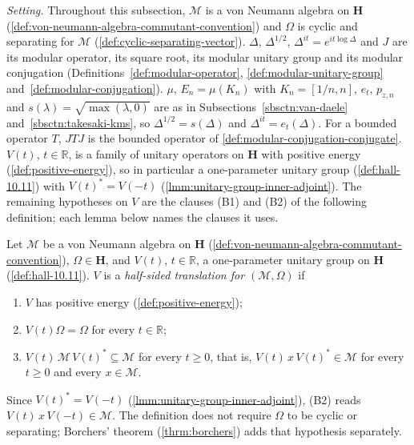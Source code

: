 \emph{Setting.} Throughout this subsection, $\mathcal{M}$ is a von Neumann algebra on $\mathbf{H}$ (\ref{def:von-neumann-algebra-commutant-convention}) and $\Omega$ is cyclic and separating for $\mathcal{M}$ (\ref{def:cyclic-separating-vector}). $\Delta$, $\Delta^{1/2}$, $\Delta^{it} = e^{it\log\Delta}$ and $J$ are its modular operator, its square root, its modular unitary group and its modular conjugation (Definitions~\ref{def:modular-operator}, \ref{def:modular-unitary-group} and~\ref{def:modular-conjugation}). $\mu$, $E_n = \mu(K_n)$ with $K_n = [1/n, n]$, $e_t$, $p_{z,n}$ and $s(\lambda) = \sqrt{\max(\lambda, 0)}$ are as in Subsections~\ref{sbsctn:van-daele} and~\ref{sbsctn:takesaki-kms}, so $\Delta^{1/2} = s(\Delta)$ and $\Delta^{it} = e_t(\Delta)$. For a bounded operator $T$, $JTJ$ is the bounded operator of \ref{def:modular-conjugation-conjugate}. $V(t)$, $t \in \mathbb{R}$, is a family of unitary operators on $\mathbf{H}$ with positive energy (\ref{def:positive-energy}), so in particular a one-parameter unitary group (\ref{def:hall-10.11}) with $V(t)^* = V(-t)$ (\ref{lmm:unitary-group-inner-adjoint}). The remaining hypotheses on $V$ are the clauses (B1) and (B2) of the following definition; each lemma below names the clauses it uses.

\begin{definition}
    \label{def:half-sided-translation}
    \leanok
    Let $\mathcal{M}$ be a von Neumann algebra on $\mathbf{H}$ (\ref{def:von-neumann-algebra-commutant-convention}), $\Omega \in \mathbf{H}$, and $V(t)$, $t \in \mathbb{R}$, a one-parameter unitary group on $\mathbf{H}$ (\ref{def:hall-10.11}). $V$ is a \emph{half-sided translation for $(\mathcal{M}, \Omega)$} if
    \begin{enumerate}
        \item[(P)] $V$ has positive energy (\ref{def:positive-energy});
        \item[(B1)] $V(t)\Omega = \Omega$ for every $t \in \mathbb{R}$;
        \item[(B2)] $V(t)\,\mathcal{M}\,V(t)^* \subseteq \mathcal{M}$ for every $t \ge 0$, that is, $V(t)\,x\,V(t)^* \in \mathcal{M}$ for every $t \ge 0$ and every $x \in \mathcal{M}$.
    \end{enumerate}
    Since $V(t)^* = V(-t)$ (\ref{lmm:unitary-group-inner-adjoint}), (B2) reads $V(t)\,x\,V(-t) \in \mathcal{M}$. The definition does not require $\Omega$ to be cyclic or separating; Borchers' theorem (\ref{thrm:borchers}) adds that hypothesis separately.
\end{definition}

